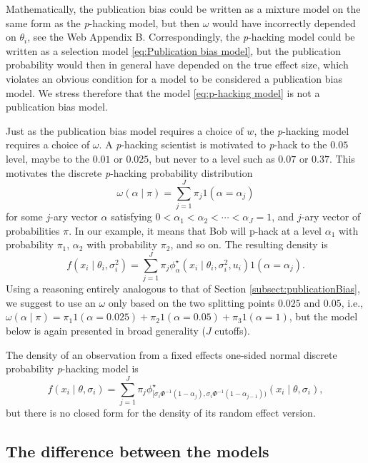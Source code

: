 \documentclass[useAMS,usenatbib,referee]{biom}
\begin{document}
Mathematically, the publication bias could be written as a mixture model on the same form as the \textit{p}-hacking model, but then $\omega$ would have incorrectly depended on $\theta_i$, see the Web Appendix B. Correspondingly, the \textit{p}-hacking model could be written as a selection model \eqref{eq:Publication bias model}, but the publication probability would then in general have depended on the true effect size, which violates an obvious condition for a model to be considered a publication bias model. We stress therefore that the model \eqref{eq:p-hacking model} is not a publication bias model.

Just as the publication bias model requires a choice of $w$, the \textit{p}-hacking model requires a choice of $\omega$. A \textit{p}-hacking scientist is motivated to \textit{p}-hack to the $0.05$ level, maybe to the $0.01$ or $0.025$, but never to a level such as $0.07$ or $0.37$. This motivates the discrete \textit{p}-hacking probability distribution
$$\omega(\alpha\mid\pi)=\sum_{j=1}^{J}\pi_{j}1(\alpha = \alpha_j)$$
for some $j$-ary vector $\alpha$ satisfying $0<\alpha_{1}<\alpha_{2}<\cdots<\alpha_{J}=1$,
and $j$-ary vector of probabilities $\pi$. In our example, it means that Bob will p-hack at a level $\alpha_1$ with probability $\pi_1$, $\alpha_{2}$ with probability $\pi_{2}$, and so on. The resulting density is 
\[
f(x_{i}\mid\theta_{i},\sigma^2_{i})=\sum_{j=1}^{J}\pi_{j}\phi_\alpha^{\star}(x_{i}\mid\theta_{i},\sigma^2_{i}, u_i)1(\alpha = \alpha_j).
\]
Using a reasoning entirely analogous to that of Section \ref{subsect:publicationBias}, we suggest to use an $\omega$ only based on the two splitting points $0.025$ and $0.05$, i.e.,  $\omega(\alpha\mid\pi) = \pi_1 1(\alpha = 0.025) + \pi_{2}1(\alpha = 0.05) + \pi_{3}1(\alpha = 1)$, but the model below is again presented in broad generality ($J$ cutoffs).

The density of an observation from a fixed effects one-sided normal discrete probability \textit{p}-hacking model is
\begin{equation*}
f(x_{i}\mid\theta,\sigma_{i}) = \sum_{j=1}^{J}\pi_{j}\phi^{\star}_{[\sigma_i\Phi^{-1}(1-\alpha_{j}),\sigma_i\Phi^{-1}(1-\alpha_{j-1}))}(x_{i}\mid\theta,\sigma_{i}),
\end{equation*}
but there is no closed form for the density of its random effect version.

\subsection{The difference between the models\label{subsec:Selection sets, meta analysis}}
\end{document}
